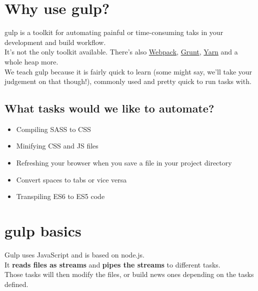 \section{Why use gulp?}

gulp is a toolkit for automating painful or time-consuming taks in your development and build workflow.
\\

It's not the only toolkit available. There's also \href{https://webpack.js.org/}{Webpack}, \href{https://gruntjs.com/}{Grunt}, \href{https://yarnpkg.com/}{Yarn} and a whole heap more.
\\

We teach gulp because it is fairly quick to learn (some might say, we'll take your judgement on that though!), commonly used and pretty quick to run tasks with.
\\

\subsection{What tasks would we like to automate?}

\begin{itemize}
    \item Compiling SASS to CSS
	\item Minifying CSS and JS files
	\item Refreshing your browser when you save a file in your project directory
	\item Convert spaces to tabs or vice versa
	\item Transpiling ES6 to ES5 code
\end{itemize}


\section{gulp basics}

Gulp uses JavaScript and is based on node.js.
\\

It \textbf{reads files as streams} and \textbf{pipes the streams} to different tasks.
\\

Those tasks will then modify the files, or build news ones depending on the tasks defined.
\\

